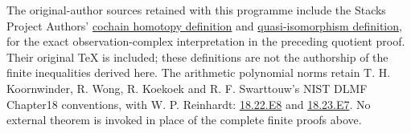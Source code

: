 The original-author sources retained with this programme include the Stacks Project Authors' \href{https://github.com/stacks/stacks-project/blob/a04446e57ec1fbc252a871afcec7752fb2807b14/homology.tex\#L3057}{cochain homotopy definition} and \href{https://github.com/stacks/stacks-project/blob/a04446e57ec1fbc252a871afcec7752fb2807b14/homology.tex\#L3160}{quasi-isomorphism definition}, for the exact observation-complex interpretation in the preceding quotient proof. Their original TeX is included; these definitions are not the authorship of the finite inequalities derived here. The arithmetic polynomial norms retain T. H. Koornwinder, R. Wong, R. Koekoek and R. F. Swarttouw's NIST DLMF Chapter18 conventions, with W. P. Reinhardt: \href{https://dlmf.nist.gov/18.22.E8}{18.22.E8} and \href{https://dlmf.nist.gov/18.23.E7}{18.23.E7}. No external theorem is invoked in place of the complete finite proofs above.
